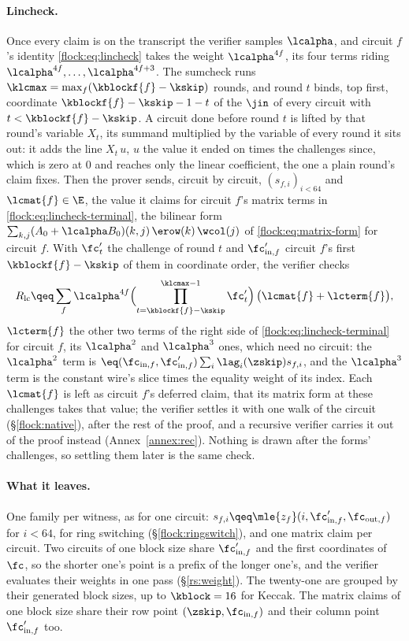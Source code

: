 \paragraph{Lincheck.} Once every claim is on the transcript the verifier samples $\lcalpha$, and circuit $f$'s identity \eqref{flock:eq:lincheck} takes the weight $\lcalpha^{4f}$, its four terms riding $\lcalpha^{4f},\dots,\lcalpha^{4f+3}$. The sumcheck runs $\klcmax=\max_f(\kblockf{f}-\kskip)$ rounds, and round $t$ binds, top first, coordinate $\kblockf{f}-\kskip-1-t$ of the $\jin$ of every circuit with $t<\kblockf{f}-\kskip$. A circuit done before round $t$ is lifted by that round's variable $X_t$, its summand multiplied by the variable of every round it sits out: it adds the line $X_t\,u$, $u$ the value it ended on times the challenges since, which is zero at $0$ and reaches only the linear coefficient, the one a plain round's claim fixes. Then the prover sends, circuit by circuit, $(s_{f,i})_{i<64}$ and $\lcmat{f}\in\E$, the value it claims for circuit $f$'s matrix terms in \eqref{flock:eq:lincheck-terminal}, the bilinear form $\sum_{k,j}(A_{0}+\lcalpha B_{0})(k,j)\,\erow(k)\,\wcol(j)$ of \eqref{flock:eq:matrix-form} for circuit $f$. With $\fc'_t$ the challenge of round $t$ and $\fc'_{\mathrm{in},f}$ circuit $f$'s first $\kblockf{f}-\kskip$ of them in coordinate order, the verifier checks
\begin{equation}\label{flock:eq:batch-lc-terminal}
R_{\mathrm{lc}}\qeq\sum_f\lcalpha^{4f}\Bigl(\prod_{t=\kblockf{f}-\kskip}^{\klcmax-1}\fc'_t\Bigr)\,\bigl(\lcmat{f}+\lcterm{f}\bigr),
\end{equation}
$\lcterm{f}$ the other two terms of the right side of \eqref{flock:eq:lincheck-terminal} for circuit $f$, its $\lcalpha^2$ and $\lcalpha^3$ ones, which need no circuit: the $\lcalpha^2$ term is $\eq(\fc_{\mathrm{in},f},\fc'_{\mathrm{in},f})\sum_i\lag_i(\zskip)s_{f,i}$, and the $\lcalpha^3$ term is the constant wire's slice times the equality weight of its index. Each $\lcmat{f}$ is left as circuit $f$'s deferred claim, that its matrix form at these challenges takes that value; the verifier settles it with one walk of the circuit (\S\ref{flock:native}), after the rest of the proof, and a recursive verifier carries it out of the proof instead (Annex~\ref{annex:rec}). Nothing is drawn after the forms' challenges, so settling them later is the same check.

\paragraph{What it leaves.} One family per witness, as for one circuit: $s_{f,i}\qeq\mle{z_f}(i,\fc'_{\mathrm{in},f},\fc_{\mathrm{out},f})$ for $i<64$, for ring switching (\S\ref{flock:ringswitch}), and one matrix claim per circuit. Two circuits of one block size share $\fc'_{\mathrm{in},f}$ and the first coordinates of $\fc$, so the shorter one's point is a prefix of the longer one's, and the verifier evaluates their weights in one pass (\S\ref{rs:weight}). The twenty-one are grouped by their generated block sizes, up to $\kblock=16$ for Keccak. The matrix claims of one block size share their row point $(\zskip,\fc_{\mathrm{in},f})$ and their column point $\fc'_{\mathrm{in},f}$ too.

